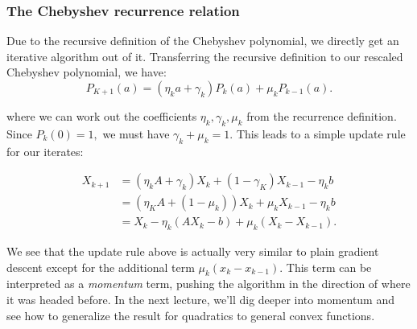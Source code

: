 \subsubsection{The Chebyshev recurrence relation}
Due to the recursive definition of the Chebyshev polynomial, we directly get an iterative algorithm out of it. Transferring the recursive definition to our rescaled Chebyshev polynomial, we have:
\begin{equation*}
P_{K+1}(a) = (\eta_k a + \gamma_k)P_k(a) + \mu_k P_{k-1}(a).
\end{equation*}

where we can work out the coefficients $\eta_k,\gamma_k,\mu_k$ from the recurrence definition. Since $P_k(0)=1,$ we must have $\gamma_k+\mu_k=1.$ This leads to a simple update rule for our iterates:

\begin{eqnarray*}
X_{k+1} &= (\eta_k A + \gamma_k)X_k + (1 - \gamma_K)X_{k-1} - \eta_k b \\
&= (\eta_K A + (1 - \mu_k))X_k + \mu_k X_{k-1} - \eta_k b \\
&= X_k - \eta_k(AX_k - b) + \mu_k(X_k - X_{k-1}).
\end{eqnarray*}

We see that the update rule above is actually very similar to plain gradient descent except for the additional term  $\mu_k(x_k - x_{k-1}).$ This term can be interpreted as a \textit{momentum} term, pushing the algorithm in the direction of where it was headed before. In the next lecture, we'll dig deeper into momentum and see how to generalize the result for quadratics to general convex functions.

